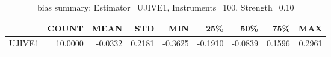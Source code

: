 \begin{table}[ht]
\centering
\caption{bias summary: Estimator=UJIVE1, Instruments=100, Strength=0.10}
\begin{tabular}{lrrrrrrrr}
\toprule
 & COUNT & MEAN & STD & MIN & 25\% & 50\% & 75\% & MAX \\
\midrule
UJIVE1 & 10.0000 & -0.0332 & 0.2181 & -0.3625 & -0.1910 & -0.0839 & 0.1596 & 0.2961 \\
\bottomrule
\end{tabular}
\end{table}
